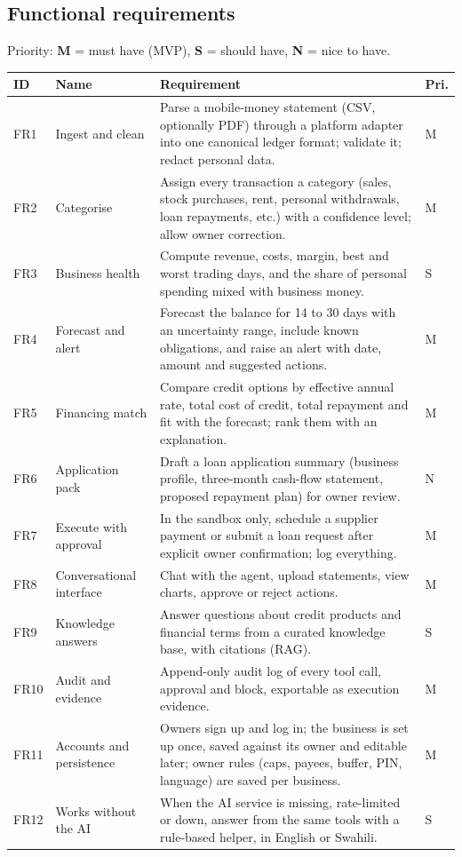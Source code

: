 \documentclass[10pt,a4paper]{article}
\begin{document}
\subsection{Functional requirements}
Priority: \textbf{M} = must have (MVP), \textbf{S} = should have, \textbf{N} = nice to have.

\begin{longtable}{@{}p{1.1cm}p{3.3cm}p{9.9cm}p{0.8cm}@{}}
\toprule
\textbf{ID} & \textbf{Name} & \textbf{Requirement} & \textbf{Pri.}\\
\midrule\endhead
FR1 & Ingest and clean & Parse a mobile-money statement (CSV, optionally PDF) through a platform adapter into one canonical ledger format; validate it; redact personal data. & M\\
FR2 & Categorise & Assign every transaction a category (sales, stock purchases, rent, personal withdrawals, loan repayments, etc.) with a confidence level; allow owner correction. & M\\
FR3 & Business health & Compute revenue, costs, margin, best and worst trading days, and the share of personal spending mixed with business money. & S\\
FR4 & Forecast and alert & Forecast the balance for 14 to 30 days with an uncertainty range, include known obligations, and raise an alert with date, amount and suggested actions. & M\\
FR5 & Financing match & Compare credit options by effective annual rate, total cost of credit, total repayment and fit with the forecast; rank them with an explanation. & M\\
FR6 & Application pack & Draft a loan application summary (business profile, three-month cash-flow statement, proposed repayment plan) for owner review. & N\\
FR7 & Execute with approval & In the sandbox only, schedule a supplier payment or submit a loan request after explicit owner confirmation; log everything. & M\\
FR8 & Conversational interface & Chat with the agent, upload statements, view charts, approve or reject actions. & M\\
FR9 & Knowledge answers & Answer questions about credit products and financial terms from a curated knowledge base, with citations (RAG). & S\\
FR10 & Audit and evidence & Append-only audit log of every tool call, approval and block, exportable as execution evidence. & M\\
FR11 & Accounts and persistence & Owners sign up and log in; the business is set up once, saved against its owner and editable later; owner rules (caps, payees, buffer, PIN, language) are saved per business. & M\\
FR12 & Works without the AI & When the AI service is missing, rate-limited or down, answer from the same tools with a rule-based helper, in English or Swahili. & S\\
\bottomrule
\end{longtable}
\end{document}
